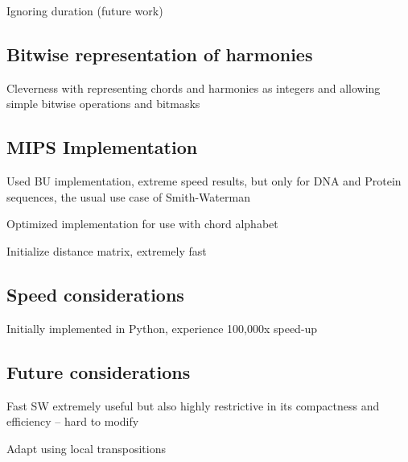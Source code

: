 \item Ignoring duration (future work)

\subsection{Bitwise representation of harmonies}

\item Cleverness with representing chords and harmonies as integers and allowing simple bitwise operations and bitmasks

\subsection{MIPS Implementation}

\item Used BU implementation, extreme speed results, but only for DNA and Protein sequences, the usual use case of Smith-Waterman

\item Optimized implementation for use with chord alphabet

\item Initialize distance matrix, extremely fast

\subsection{Speed considerations}

\item Initially implemented in Python, experience 100,000x speed-up

\subsection{Future considerations}

\item Fast SW extremely useful but also highly restrictive in its compactness and efficiency -- hard to modify

\item Adapt using local transpositions